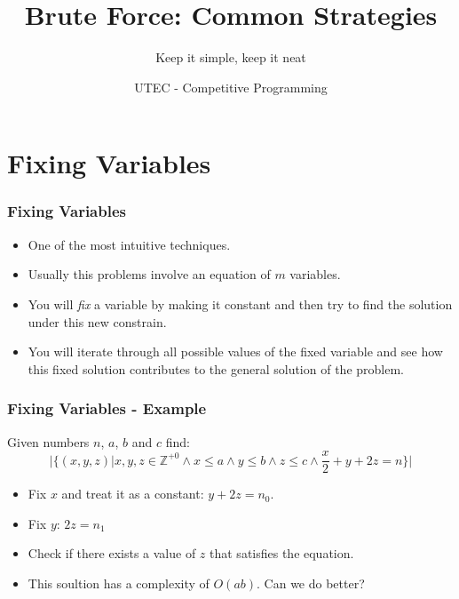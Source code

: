 \documentclass{beamer}
\begin{document}
\newcommand{\tabitem}{~~\llap{\textbullet}~~}




\title{Brute Force: Common Strategies}
\subtitle{Keep it simple, keep it neat}
\author{UTEC - Competitive Programming}
\date{}

\maketitle

\section{Fixing Variables}

\begin{frame}
	\frametitle{Fixing Variables}

	\begin{itemize}
		\item One of the most intuitive techniques.
		\item Usually this problems involve an equation of $m$ variables.
		\item You will \textit{fix} a variable by making it constant and then try to find the solution under this new constrain.
		\item You will iterate through all possible values of the fixed variable and see how this fixed solution contributes to the general solution of the problem.
	\end{itemize}
\end{frame}

\begin{frame}[fragile]
	\frametitle{Fixing Variables - Example}

	Given numbers $n$, $a$, $b$ and $c$ find:
	$$|\{(x, y, z) | x, y, z \in \mathbb{Z}^{+0}
	\wedge x \leq a \wedge y \leq b \wedge z \leq c
	\wedge \frac{x}{2} + y + 2z = n\}|$$

	\begin{itemize}
		\item<2-> Fix $x$ and treat it as a constant: $y + 2z = n_0$.
		\item<3-> Fix $y$: $2z = n_1$
		\item<4-> Check if there exists a value of $z$ that satisfies the equation.
		\item<5-> This soultion has a complexity of $O(ab)$. Can we do better?
	\end{itemize}
\end{frame}
\end{document}

